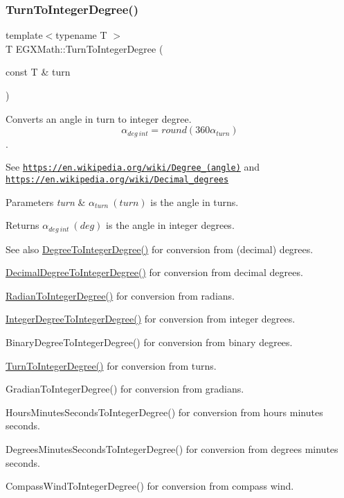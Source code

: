 \subsubsection{\texorpdfstring{Turn\+To\+Integer\+Degree()}{TurnToIntegerDegree()}}
{\footnotesize\ttfamily template$<$typename T $>$ \\
T E\+G\+X\+Math\+::\+Turn\+To\+Integer\+Degree (\begin{DoxyParamCaption}\item[{const T \&}]{turn }\end{DoxyParamCaption})}



Converts an angle in turn to integer degree. \[\alpha_{deg\ int}=round(360\alpha_{turn})\]. 

See \href{https://en.wikipedia.org/wiki/Degree_(angle)}{\tt https\+://en.\+wikipedia.\+org/wiki/\+Degree\+\_\+(angle)} and \href{https://en.wikipedia.org/wiki/Decimal_degrees}{\tt https\+://en.\+wikipedia.\+org/wiki/\+Decimal\+\_\+degrees} 
\begin{DoxyParams}{Parameters}
{\em turn} & $\alpha_{turn}\ (turn)$ is the angle in turns. \\
\hline
\end{DoxyParams}
\begin{DoxyReturn}{Returns}
$\alpha_{deg\ int}\ (deg)$ is the angle in integer degrees. 
\end{DoxyReturn}
\begin{DoxySeeAlso}{See also}
\mbox{\hyperlink{group___e_g_x_math-_angle_conversions-_degree_gaabd20f21be3c18ee423d0bc1a677c6f6}{Degree\+To\+Integer\+Degree()}} for conversion from (decimal) degrees. 

\mbox{\hyperlink{group___e_g_x_math-_angle_conversions-_decimal_degree_ga115239ea7202dbc6a6c9fba68e0ac189}{Decimal\+Degree\+To\+Integer\+Degree()}} for conversion from decimal degrees. 

\mbox{\hyperlink{group___e_g_x_math-_angle_conversions-_radian_gac84796dfdeb56235e1e338522a5f9350}{Radian\+To\+Integer\+Degree()}} for conversion from radians. 

\mbox{\hyperlink{group___e_g_x_math-_angle_conversions-_integer_degree_gac9e870bdfa60dd2bb61469fdf6eedd7c}{Integer\+Degree\+To\+Integer\+Degree()}} for conversion from integer degrees. 

Binary\+Degree\+To\+Integer\+Degree() for conversion from binary degrees. 

\mbox{\hyperlink{group___e_g_x_math-_angle_conversions-_turn_ga999085c62490997da870618e20e88ebb}{Turn\+To\+Integer\+Degree()}} for conversion from turns. 

Gradian\+To\+Integer\+Degree() for conversion from gradians. 

Hours\+Minutes\+Seconds\+To\+Integer\+Degree() for conversion from hours minutes seconds. 

Degrees\+Minutes\+Seconds\+To\+Integer\+Degree() for conversion from degrees minutes seconds. 

Compass\+Wind\+To\+Integer\+Degree() for conversion from compass wind. 
\end{DoxySeeAlso}
